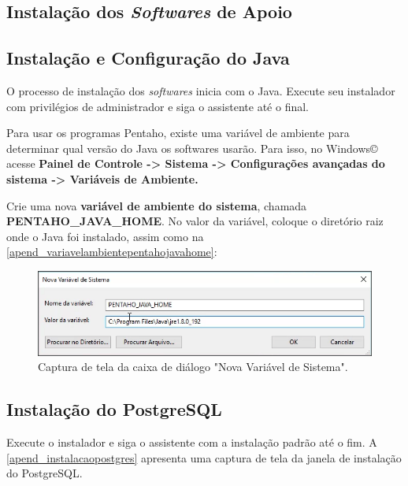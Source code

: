 \begin{apendicesenv}
\section{Instalação dos \textit{Softwares} de Apoio}
\subsection{Instalação e Configuração do Java}
O processo de instalação dos \textit{softwares} inicia com o Java. Execute seu instalador com privilégios de administrador e siga o assistente até o final.

Para usar os programas Pentaho, existe uma variável de ambiente para determinar qual versão do Java os softwares usarão. Para isso, no Windows© acesse \textbf{Painel de Controle -> Sistema -> Configurações avançadas do sistema -> Variáveis de Ambiente.}

Crie uma nova \textbf{variável de ambiente do sistema}, chamada \textbf{PENTAHO\_JAVA\_HOME}. No valor da variável, coloque o diretório raiz onde o Java foi instalado, assim como na \autoref{apend_variavelambientepentahojavahome}:

\begin{figure}[htb]
	\caption{\label{apend_variavelambientepentahojavahome}Captura de tela da caixa de diálogo "Nova Variável de Sistema".}
	\begin{center}
	    \includegraphics[scale=0.6]{Imagens/apendice variaveisambientepentahojavahome.png}
	\end{center}
\end{figure}

\subsection{Instalação do PostgreSQL}
Execute o instalador e siga o assistente com a instalação padrão até o fim. A \autoref{apend_instalacaopostgres} apresenta uma captura de tela da janela de instalação do PostgreSQL.


\end{apendicesenv}
